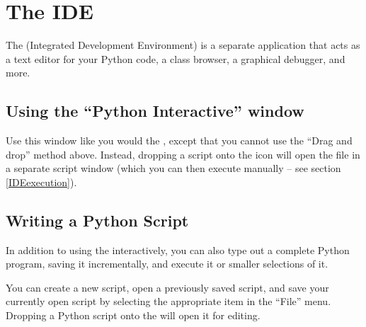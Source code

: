
 

\section{The IDE\label{IDE}}

The  (Integrated Development Environment) is a
separate application that acts as a text editor for your Python code,
a class browser, a graphical debugger, and more.


\subsection{Using the ``Python Interactive'' window}

Use this window like you would the , except
that you cannot use the ``Drag and drop'' method above. Instead,
dropping a script onto the  icon will open the
file in a separate script window (which you can then execute manually
-- see section \ref{IDEexecution}).


\subsection{Writing a Python Script \label{IDEwrite}}

In addition to using the  interactively, you can
also type out a complete Python program, saving it incrementally, and
execute it or smaller selections of it.

You can create a new script, open a previously saved script, and save
your currently open script by selecting the appropriate item in the
``File'' menu. Dropping a Python script onto the
 will open it for editing.

